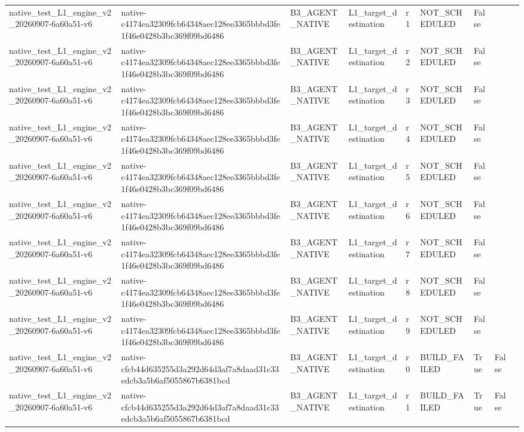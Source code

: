 \begin{tabular}{lllllllll}
native\_test\_L1\_engine\_v2\_20260907-6a60a51-v6 & native-c4174ea32309fcb64348aec128ee3365bbbd3fe1f46e0428b3bc369f09bd6486 & B3\_AGENT\_NATIVE & L1\_target\_destination & r1 & NOT\_SCHEDULED & False &  &  \\
native\_test\_L1\_engine\_v2\_20260907-6a60a51-v6 & native-c4174ea32309fcb64348aec128ee3365bbbd3fe1f46e0428b3bc369f09bd6486 & B3\_AGENT\_NATIVE & L1\_target\_destination & r2 & NOT\_SCHEDULED & False &  &  \\
native\_test\_L1\_engine\_v2\_20260907-6a60a51-v6 & native-c4174ea32309fcb64348aec128ee3365bbbd3fe1f46e0428b3bc369f09bd6486 & B3\_AGENT\_NATIVE & L1\_target\_destination & r3 & NOT\_SCHEDULED & False &  &  \\
native\_test\_L1\_engine\_v2\_20260907-6a60a51-v6 & native-c4174ea32309fcb64348aec128ee3365bbbd3fe1f46e0428b3bc369f09bd6486 & B3\_AGENT\_NATIVE & L1\_target\_destination & r4 & NOT\_SCHEDULED & False &  &  \\
native\_test\_L1\_engine\_v2\_20260907-6a60a51-v6 & native-c4174ea32309fcb64348aec128ee3365bbbd3fe1f46e0428b3bc369f09bd6486 & B3\_AGENT\_NATIVE & L1\_target\_destination & r5 & NOT\_SCHEDULED & False &  &  \\
native\_test\_L1\_engine\_v2\_20260907-6a60a51-v6 & native-c4174ea32309fcb64348aec128ee3365bbbd3fe1f46e0428b3bc369f09bd6486 & B3\_AGENT\_NATIVE & L1\_target\_destination & r6 & NOT\_SCHEDULED & False &  &  \\
native\_test\_L1\_engine\_v2\_20260907-6a60a51-v6 & native-c4174ea32309fcb64348aec128ee3365bbbd3fe1f46e0428b3bc369f09bd6486 & B3\_AGENT\_NATIVE & L1\_target\_destination & r7 & NOT\_SCHEDULED & False &  &  \\
native\_test\_L1\_engine\_v2\_20260907-6a60a51-v6 & native-c4174ea32309fcb64348aec128ee3365bbbd3fe1f46e0428b3bc369f09bd6486 & B3\_AGENT\_NATIVE & L1\_target\_destination & r8 & NOT\_SCHEDULED & False &  &  \\
native\_test\_L1\_engine\_v2\_20260907-6a60a51-v6 & native-c4174ea32309fcb64348aec128ee3365bbbd3fe1f46e0428b3bc369f09bd6486 & B3\_AGENT\_NATIVE & L1\_target\_destination & r9 & NOT\_SCHEDULED & False &  &  \\
native\_test\_L1\_engine\_v2\_20260907-6a60a51-v6 & native-cfcb44d635255d3a292d64d3af7a8daad31c33edcb3a5b6af5055867b6381bcd & B3\_AGENT\_NATIVE & L1\_target\_destination & r0 & BUILD\_FAILED & True & False &  \\
native\_test\_L1\_engine\_v2\_20260907-6a60a51-v6 & native-cfcb44d635255d3a292d64d3af7a8daad31c33edcb3a5b6af5055867b6381bcd & B3\_AGENT\_NATIVE & L1\_target\_destination & r1 & BUILD\_FAILED & True & False &  \\

\end{tabular}
